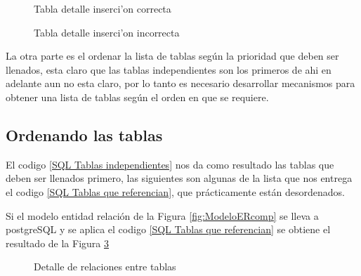 \begin{figure}[H]
\centering
{}
\caption{Tabla detalle inserci'on correcta} \label{fig:InsercionCorrecta}
\end{figure}

\begin{figure}[H]
\centering
{}
\caption{Tabla detalle inserci'on incorrecta} \label{fig:InsercionIncorrecta}
\end{figure}  
  
La otra parte es el ordenar la lista de tablas seg\'un la prioridad que deben ser llenados, esta claro que las tablas independientes son los primeros de ahi en adelante aun no esta claro, por lo tanto es necesario desarrollar mecanismos para obtener una lista de tablas seg\'un el orden en que se requiere.
\subsection{Ordenando las tablas}
El codigo \ref{SQL Tablas independientes} nos da  como resultado las tablas que deben ser llenados primero, las siguientes son algunas de la lista que nos entrega el codigo \ref{SQL Tablas que referencian}, que pr\'acticamente est\'an desordenados.

Si el modelo entidad relaci\'on de la Figura \ref{fig:ModeloERcomp} se lleva a postgreSQL y se aplica el codigo \ref{SQL Tablas que referencian} se obtiene el resultado de la Figura \ref{fig:referenciasModeloComp}

\begin{figure}[H]
\centering
{}
\caption{Detalle de relaciones entre tablas} \label{fig:referenciasModeloComp}
\end{figure}

